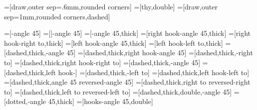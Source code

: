 %
%

=[draw,outer sep=.6mm,rounded corners]
=[thy,double]
=[draw,outer sep=1mm,rounded corners,dashed]

\usetikzlibrary{arrows}
\newcommand{\@mmtarrowtip}{angle 45}
\newcommand{\@mmtreversearrowtip}{angle 45 reversed}
\newcommand{\@mmtarrowtipepi}{triangle 45}
\newcommand{\@mmtarrowtipmonoright}{right hook}
\newcommand{\@mmtarrowtipmonoleft}{left hook}
\newcommand{\@mmtarrowtippartial}{right to}
\newcommand{\@mmtarrowtippartialleft}{left to}
\newcommand{\@mmtreversearrowtippartial}{right to reversed}
\newcommand{\@mmtreversearrowtippartialleft}{left to reversed}

=[-\@mmtarrowtip] 
=[|-\@mmtarrowtip] %
=[-\@mmtarrowtip,thick]
=[\@mmtarrowtipmonoright-\@mmtarrowtip,thick]
=[\@mmtarrowtipmonoright-\@mmtarrowtippartial,thick]
=[\@mmtarrowtipmonoleft-\@mmtarrowtip,thick]
=[\@mmtarrowtipmonoleft-\@mmtarrowtippartialleft,thick]
=[dashed,thick,-\@mmtarrowtip]
=[dashed,thick,\@mmtarrowtipmonoright-\@mmtarrowtip]
=[dashed,thick,-\@mmtarrowtippartial]
=[dashed,thick,\@mmtarrowtipmonoright-\@mmtarrowtippartial]
=[dashed,thick,-\@mmtarrowtip]
=[dashed,thick,\@mmtarrowtipmonoleft-\@mmtarrowtipleft]
=[dashed,thick,-\@mmtarrowtippartialleft]
=[dashed,thick,\@mmtarrowtipmonoleft-\@mmtarrowtippartialleft]
=[dashed,thick,\@mmtreversearrowtip-\@mmtarrowtip]
=[dashed,thick,\@mmtreversearrowtippartial-\@mmtarrowtippartial]
=[dashed,thick,\@mmtreversearrowtippartialleft-\@mmtarrowtippartialleft]
=[dashed,thick,double,-\@mmtarrowtip]
=[dotted,-\@mmtarrowtip,thick]
=[hooks-\@mmtarrowtip,double] 

